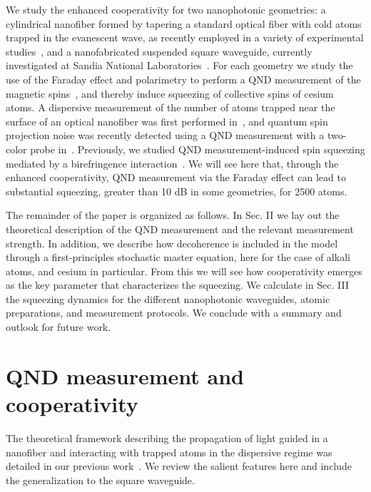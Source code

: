 \documentclass[preprint,aps,pra,onecolumn,superscriptaddress]{revtex4-1} %
\begin{document}
We study the enhanced cooperativity for two nanophotonic geometries: a cylindrical nanofiber formed by tapering a standard optical fiber with cold atoms trapped in the evanescent wave, as recently employed in a variety of experimental studies~\cite{Vetsch2010Optical, Goban2012, Reitz2013, Lee2015, Goban2014, Reitz2014, Volz2014Nonlinear, Beguin2014, Mitsch2014,Kato2015Strong, Sayrin2015, Sayrin2015a, Mitsch2014a, Solano2017Dynamics, Beguin2017Observation}, and a nanofabricated suspended square waveguide, currently investigated at Sandia National Laboratories~\cite{Lee2017Characterizations}.  For each geometry we study the use of the Faraday effect and polarimetry to perform a QND measurement of the magnetic spins~\cite{Smith2003a}, and thereby induce squeezing of collective spins of cesium atoms.  A dispersive measurement of the number of atoms trapped near the surface of an optical nanofiber was first performed in~\cite{Dawkins2011}, and quantum spin projection noise was recently detected using a QND measurement with a two-color probe in~\cite{Beguin2014, Beguin2017Observation}.  Previously, we studied QND measurement-induced spin squeezing  mediated by a birefringence interaction~\cite{Qi2016}. We will see here that, through the enhanced cooperativity, QND measurement via the Faraday effect can lead to substantial squeezing, greater than 10 dB in some geometries, for 2500 atoms.

The remainder of the paper is organized as follows.  In Sec. II we lay out the theoretical description of the QND measurement and the relevant measurement strength.  In addition, we describe how decoherence is included in the model through a first-principles stochastic master equation, here for the case of alkali atoms, and cesium in particular.  From this we will see how cooperativity emerges as the key parameter that characterizes the squeezing.  We calculate in Sec. III the squeezing dynamics for the different nanophotonic waveguides, atomic preparations, and measurement protocols.  We conclude with a summary and outlook for future work.


\section{QND measurement and cooperativity} \label{Sec::QNDandCooperativityTheory}
The theoretical framework describing the propagation of light guided in a nanofiber and interacting with trapped atoms in the dispersive regime was detailed in our previous work~\cite{Qi2016}.  We review the salient features here and include the generalization to the square waveguide.
\end{document}
